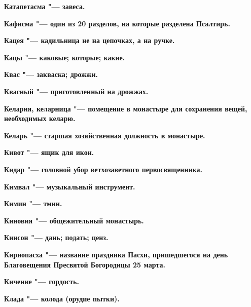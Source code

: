 \bfseries Катапетасма \normalfont{} "--- завеса. 




\bfseries Кафисма \normalfont{} "--- один из 20 разделов, на которые разделена Псалтирь. 




\bfseries Кацея \normalfont{} "--- кадильница не на цепочках, а на ручке. 




\bfseries Кацы \normalfont{} "--- каковые; которые; какие. 




\bfseries Квас \normalfont{} "--- закваска; дрожжи. 




\bfseries Квасный \normalfont{} "--- приготовленный на дрожжах. 




\bfseries Келарня, келарница \normalfont{} "--- помещение в монастыре для сохранения вещей, необходимых келарю. 




\bfseries Келарь \normalfont{} "--- старшая хозяйственная должность в монастыре. 




\bfseries Кивот \normalfont{} "--- ящик для икон. 




\bfseries Кидар \normalfont{} "--- головной убор ветхозаветного первосвященника. 




\bfseries Кимвал \normalfont{} "--- музыкальный инструмент. 




\bfseries Кимин \normalfont{} "--- тмин. 




\bfseries Киновия \normalfont{} "--- общежительный монастырь. 




\bfseries Кинсон \normalfont{} "--- дань; подать; ценз. 




\bfseries Кириопасха \normalfont{} "--- название праздника Пасхи, пришедшегося на день Благовещения Пресвятой Богородицы 25 марта. 




\bfseries Кичение \normalfont{} "--- гордость. 




\bfseries Клада \normalfont{} "--- колода (орудие пытки). 




